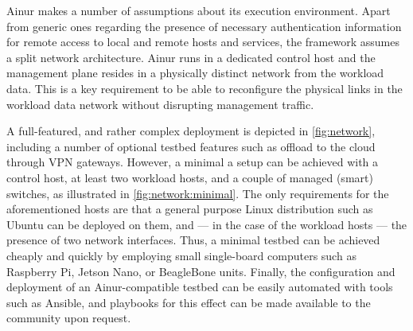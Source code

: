 Ainur makes a number of assumptions about its execution environment.
Apart from generic ones regarding the presence of necessary authentication information for remote access to local and remote hosts and services, the framework assumes a split network architecture.
Ainur runs in a dedicated control host and the management plane resides in a physically distinct network from the workload data.
This is a key requirement to be able to reconfigure the physical links in the workload data network without disrupting management traffic.

A full-featured, and rather complex deployment is depicted in \cref{fig:network}, including a number of optional testbed features such as offload to the cloud through \ac{VPN} gateways.
However, a minimal a setup can be achieved with a control host, at least two workload hosts, and a couple of managed (smart) switches, as illustrated in \cref{fig:network:minimal}.
The only requirements for the aforementioned hosts are that a general purpose Linux distribution such as Ubuntu can be deployed on them, and --- in the case of the workload hosts --- the presence of two network interfaces.
Thus, a minimal testbed can be achieved cheaply and quickly by employing small single-board computers such as Raspberry Pi, Jetson Nano, or BeagleBone units.
Finally, the configuration and deployment of an Ainur-compatible testbed can be easily automated with tools such as Ansible, and playbooks for this effect can be made available to the community upon request.


